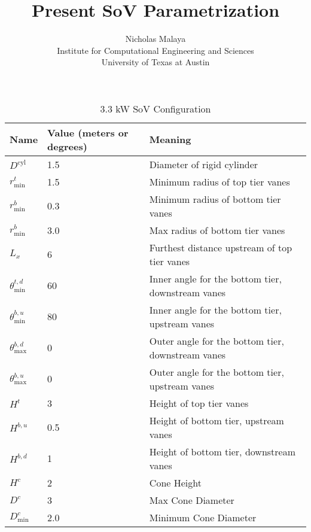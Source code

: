 \documentclass{article}
\title{\bf{Present SoV Parametrization}}
\author{Nicholas Malaya \\ Institute for Computational Engineering and
Sciences \\ University of Texas at Austin} \date{}
\begin{document}
\maketitle

\newpage

\begin{table}[]
\centering
\begin{tabular}{lll}
Name                        & Value (meters or degrees) & Meaning                    \\
 \hline
$D^{\text{cyl}}$            &  1.5  & Diameter of rigid cylinder \\
$r^t_{\text{min}}$          &  1.5  & Minimum radius of top tier vanes \\
$r^b_{\text{min}}$          &  0.3  & Minimum radius of bottom tier vanes \\
$r^b_{\text{min}}$          &  3.0  & Max radius of bottom tier vanes \\
       $L_x$                &   6   & Furthest distance upstream of top	 tier vanes \\
$\theta_{\text{min}}^{t,d}$ &  60   & Inner angle for the bottom tier, downstream vanes \\
$\theta_{\text{min}}^{b,u}$ &  80   & Inner angle for the bottom tier, upstream vanes \\
$\theta_{\text{max}}^{b,d}$ &   0   & Outer angle for the bottom  tier, downstream vanes \\
$\theta_{\text{max}}^{b,u}$ &   0   & Outer angle for the bottom tier, upstream vanes \\
 $H^t    $                  &   3   & Height of top tier vanes \\
 $H^{b,u}$                  &  0.5  & Height of bottom tier, upstream vanes \\
 $H^{b,d}$                  &   1   & Height of bottom tier, downstream vanes \\
 $H^{c}$                    &   2   & Cone Height \\
 $D^{c}$                    &   3   & Max Cone Diameter \\
 $D_\text{min}^{c}$         &  2.0  & Minimum Cone Diameter \\
\end{tabular}
\label{my-label}
\caption{3.3 kW SoV Configuration}
\end{table}
\end{document}
